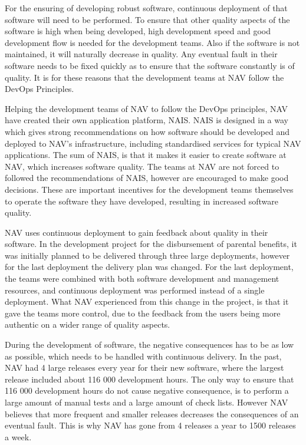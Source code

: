 For the ensuring of developing robust software, continuous deployment of that software will need to be performed. To ensure that other quality aspects of the software is high when being developed, high development speed and good development flow is needed for the development teams. Also if the software is not maintained, it will naturally decrease in quality. Any eventual fault in their software needs to be fixed quickly as to ensure that the software constantly is of quality. It is for these reasons that the development teams at NAV follow the DevOps Principles.

Helping the development teams of NAV to follow the DevOps principles, NAV have created their own application platform, NAIS. NAIS is designed in a way which gives strong recommendations on how software should be developed and deployed to NAV's infrastructure, including standardised services for typical NAV applications. The sum of NAIS, is that it makes it easier to create software at NAV, which increases software quality. The teams at NAV are not forced to followed the recommendations of NAIS, however are encouraged to make good decisions. These are important incentives for the development teams themselves to operate the software they have developed, resulting in increased software quality.

NAV uses continuous deployment to gain feedback about quality in their software. In the development project for the disbursement of parental benefits, it was initially planned to be delivered through three large deployments, however for the last deployment the delivery plan was changed. For the last deployment, the teams were combined with both software development and management resources, and continuous deployment was performed instead of a single deployment. What NAV experienced from this change in the project, is that it gave the teams more control, due to the feedback from the users being more authentic on a wider range of quality aspects. 

During the development of software, the negative consequences has to be as low as possible, which needs to be handled with continuous delivery. In the past, NAV had 4 large releases every year for their new software, where the largest release included about 116 000 development hours. The only way to ensure that 116 000 development hours do not cause negative consequence, is to perform a large amount of manual tests and a large amount of check lists. However NAV believes that more frequent and smaller releases decreases the consequences of an eventual fault. This is why NAV has gone from 4 releases a year to 1500 releases a week.

